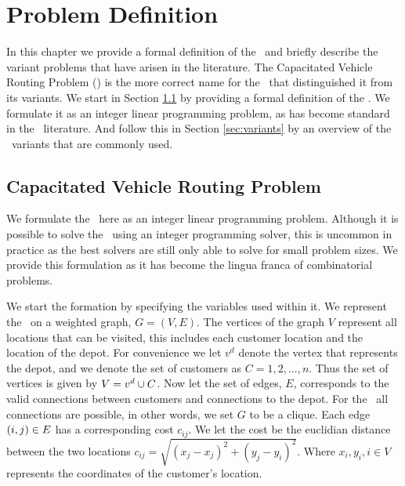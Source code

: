 
\chapter{Problem Definition}
\label{chap:pd}

In this chapter we provide a formal definition of the \VRP\ and briefly describe the variant problems that have arisen in the literature. The Capacitated Vehicle Routing Problem (\CVRP) is the more correct name for the \VRP\ that distinguished it from its variants. We start in Section \ref{sec:capacitatedvehicleroutingproblem} by providing a formal definition of the \CVRP. We formulate it as an integer linear programming problem, as has become standard in the \VRP\ literature. And follow this in Section \ref{sec:variants} by an overview of the \VRP\ variants that are commonly used.

\section{Capacitated Vehicle Routing Problem}
\label{sec:capacitatedvehicleroutingproblem}

We formulate the \CVRP\ here as an integer linear programming problem. Although it is possible to solve the \CVRP\ using an integer programming solver, this is uncommon in practice as the best solvers are still only able to solve for small problem sizes. We provide this formulation as it has become the lingua franca of combinatorial problems.

We start the formation by specifying the variables used within it. We represent the \CVRP\ on a weighted graph, $G = (V, E)$. The vertices of the graph $V$ represent all locations that can be visited, this includes each customer location and the location of the depot. For convenience we let $v^d$ denote the vertex that represents the depot, and we denote the set of customers as $C = 1,2,...,n$. Thus the set of vertices is given by $V = v^d \cup C$. Now let the set of edges, $E$, corresponds to the valid connections between customers and connections to the depot. For the \CVRP\ all connections are possible, in other words, we set $G$ to be a clique. Each edge $(i,j) \in E$ has a corresponding cost $c_{ij}$. We let the cost be the euclidian distance between the two locations $c_{ij} = \sqrt{(x_j - x_j)^2 + (y_j -  y_i)^2}$. Where $x_i, y_i, i \in V$ represents the coordinates of the customer's location. 

